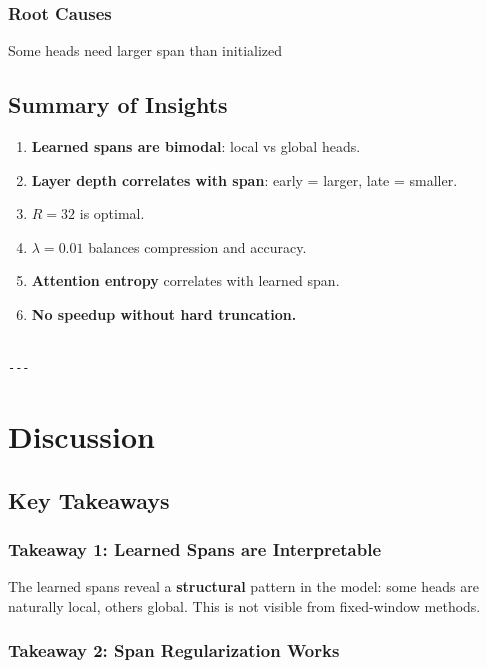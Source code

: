\subsubsection{Root Causes}

Some heads need larger span than initialized

\subsection{Summary of Insights}

\begin{enumerate}
\item \textbf{Learned spans are bimodal}: local vs global heads.
\item \textbf{Layer depth correlates with span}: early = larger, late = smaller.
\item \textbf{$R = 32$} is optimal.
\item \textbf{$\lambda = 0.01$} balances compression and accuracy.
\item \textbf{Attention entropy} correlates with learned span.
\item \textbf{No speedup without hard truncation.}
\end{enumerate}
\begin{lstlisting}

---
\end{lstlisting}


\section{Discussion}

\subsection{Key Takeaways}

\subsubsection{Takeaway 1: Learned Spans are Interpretable}

The learned spans reveal a \textbf{structural} pattern in the model: some heads 
are naturally local, others global. This is not visible from fixed-window 
methods.

\subsubsection{Takeaway 2: Span Regularization Works}

